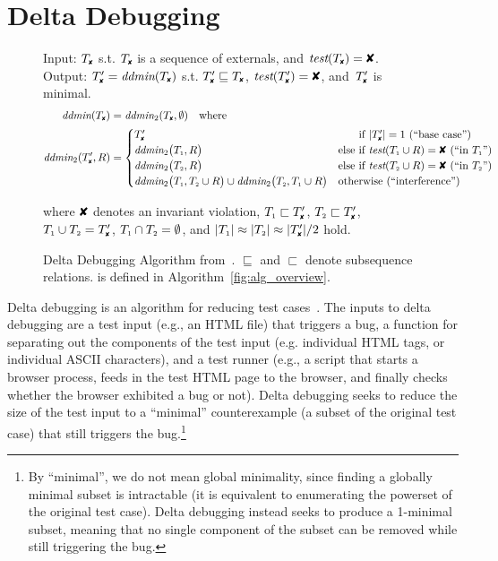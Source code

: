 \section{Delta Debugging}
\label{chap:ddmin}

\begin{figure*}[tb!]
\footnotesize
\begin{boxedminipage}{\textwidth}
Input: $\cfail$ s.t. $\cfail$ is a sequence of externals, and $\test(\cfail) = \DFAIL$. Output: $\dfail
= \ddmin(\cfail)$ s.t. $\dfail \sqsubseteq
\cfail$, $\test(\dfail) = \DFAIL$, and~$\dfail$ is minimal.
\begin{align*}
\ddmin(\cfail) &= \ddmin_2(\cfail, \emptyset) \quad \text{where} \\
\ddmin_2(\dfail, R) &=
\begin{cases}
\dfail & \text{\hphantom{else }if $|\dfail| = 1$ (``base case'')} \\
\ddmin_2\bigl(\done, R\bigr) &
\text{else if $\test(\done \cup R) = \DFAIL$ (``in $\done$'')} \\
\ddmin_2\bigl(\dtwo, R\bigr) &
\text{else if $\test(\dtwo \cup R) = \DFAIL$ (``in $\dtwo$'')} \\
\ddmin_2\bigl(\done, \dtwo \cup R\bigr) \cup \ddmin_2\bigl(\dtwo, \done \cup
R\bigr) & \text{otherwise (``interference'')}
\end{cases}
\end{align*}
\begin{center}
where $\DFAIL$ denotes an invariant violation,
$\done \sqsubset \dfail$, $\dtwo \sqsubset \dfail$, $\done \cup \dtwo = \dfail$, ${T_{\scriptscriptstyle 1}} \cap
{T_{\scriptscriptstyle 2}} = \emptyset$, and $|\done| \approx |\dtwo| \approx |\dfail| / 2$
hold.
\end{center}
\end{boxedminipage}
\caption{Delta Debugging Algorithm
from~\cite{Zeller:1999:YMP:318773.318946}. $\sqsubseteq$ and $\sqsubset$ denote
subsequence relations.  is defined in Algorithm~\ref{fig:alg_overview}.}
\label{fig:ddmin}
\end{figure*}


Delta debugging is an algorithm for reducing test
cases~\cite{Zeller:1999:YMP:318773.318946,Zeller:2002:SIF:506201.506206}. The
inputs to delta debugging are a test input (e.g., an HTML file) that triggers a
bug, a function for separating out the components of the test
input (e.g. individual HTML tags, or individual ASCII characters), and a test
runner (e.g., a script that starts a browser process, feeds in the test HTML
page to the browser, and finally checks whether the browser exhibited a bug or
not). Delta debugging seeks to reduce the size of the test input to a
``minimal'' counterexample  (a subset of the original test case) that still
triggers the bug.\footnote{By ``minimal'', we do not mean global minimality,
since finding a globally minimal subset is intractable (it is equivalent to enumerating the
powerset of the original test case). Delta debugging instead seeks to produce a
1-minimal subset, meaning that no single component of the subset can be
removed while still triggering the bug.}

